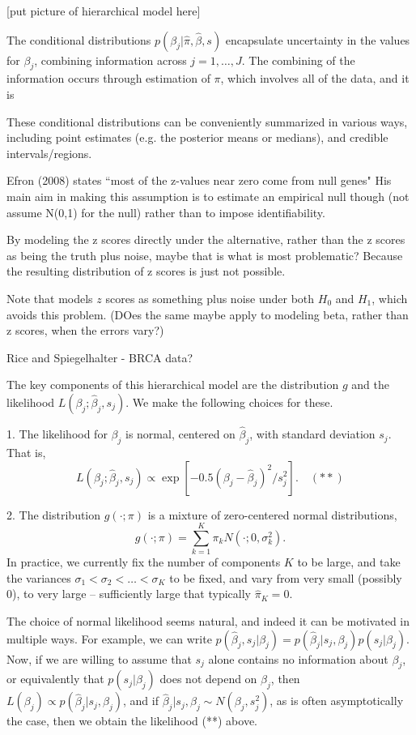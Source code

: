 \documentclass[10pt]{article}
\begin{document}
[put picture of hierarchical model here]

The conditional distributions $p(\beta_j | \hat\pi, \hat\beta, s)$ 
encapsulate uncertainty in the values for $\beta_j$, combining information across
$j=1,\dots,J$. The combining of the information occurs through estimation of
$\pi$, which involves all of the data, and it is 

These conditional distributions can be conveniently summarized
in various ways, including point estimates (e.g. the posterior means or medians),
and credible intervals/regions.

Efron (2008) states ``most of the z-values near zero come from null genes"
His main aim in making this assumption is to estimate an empirical null though (not assume N(0,1) for the null)
rather than to impose identifiability.


By modeling the z scores directly under the alternative, rather than the z scores as being the truth plus noise,
maybe that is what is most problematic? Because the resulting distribution of z scores is just not possible.

Note that \cite{muralidharan:2012} models $z$ scores as something plus noise under both $H_0$ and $H_1$, which
avoids this problem. (DOes the same maybe apply to modeling beta, rather than z scores, when the errors vary?)


Rice and Spiegelhalter - BRCA data?

The key components of this hierarchical model
are the distribution $g$ and the likelihood $L(\beta_j; \hat\beta_j, s_j)$. We make the following choices for these.

1. The likelihood for $\beta_j$ is normal, centered on $\hat\beta_j$, with standard deviation $s_j$.
That is, 
$$L(\beta_j; \hat\beta_j, s_j) \propto \exp[-0.5(\beta_j-\hat\beta_j)^2/s_j^2]. \quad (**)$$

2. The distribution $g(\cdot; \pi)$ is a mixture of zero-centered normal distributions, 
$$g(\cdot; \pi) = \sum_{k=1}^K \pi_k N(\cdot; 0, \sigma^2_k).$$
In practice, we currently fix the number of components $K$ to be large, and take the variances $\sigma_1<\sigma_2<\dots<\sigma_K$ to be fixed, and vary from very small (possibly 0), to very large --  sufficiently large that typically $\hat\pi_K=0$.

The choice of normal likelihood seems natural, and indeed it can be motivated in multiple ways. For example, we can write $p(\hat\beta_j, s_j | \beta_j) = p(\hat\beta_j | s_j, \beta_j)p(s_j | \beta_j)$. Now, if we are willing to assume that
$s_j$ alone contains no information about $\beta_j$, or equivalently that $p(s_j | \beta_j)$ does not depend on $\beta_j$, then
$L(\beta_j) \propto p(\hat\beta_j | s_j, \beta_j)$,
and if $\hat\beta_j | s_j, \beta_j \sim N(\beta_j, s_j^2)$,
as is often asymptotically the case, then we obtain the likelihood (**) above.
\end{document}
